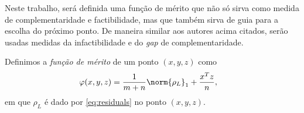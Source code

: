 Neste trabalho, será definida uma função de mérito que não só sirva como medida
de complementaridade e factibilidade, mas que também sirva de guia para a
escolha do próximo ponto. De maneira similar aos autores acima citados, serão
usadas medidas  da infactibilidade  e do \emph{gap} de complementaridade. 

\begin{defin}
\label{def:merit-function}
Definimos a \emph{função de mérito} de um ponto  $(x,y,z)$ como
\begin{align}
\varphi(x,y,z) & = \frac{1}{m+n}\norm{\rho_L}_1+ 
\frac{x^Tz}{n}, \label{eq:merit-function-as-sum}
\end{align}
em que $\rho_L$ é dado por  \eqref{eq:residuals} no ponto
$(x,y,z)$.

\end{defin}

